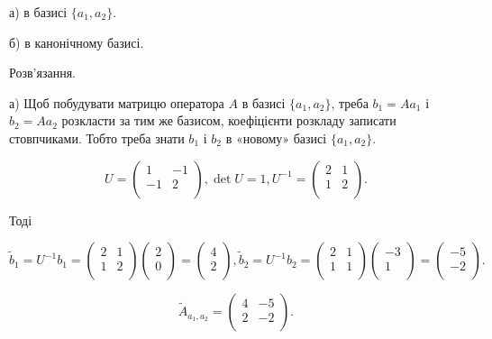 а) в базисі $\{a_1, a_2\}$.

б) в канонічному базисі.

Розв’язання.

а) Щоб побудувати матрицю оператора $A$ в базисі $\{a_1, a_2\}$, треба $b_1 = A a_1$ і
$b_2 = A a_2$ розкласти за тим же базисом, коефіцієнти розкладу записати
стовпчиками. Тобто треба знати $b_1$ і $b_2$ в «новому» базисі $\{a_1, a_2\}$.

$$U = \begin{pmatrix}
	1 & -1 \\
	-1 & 2 \\
\end{pmatrix}, \det U = 1, U^{-1} = \begin{pmatrix}
	2 & 1 \\
	1 & 2 \\
\end{pmatrix}.$$

Тоді 

$$\tilde{b}_1 = U^{-1} b_1 = \begin{pmatrix}
	2 & 1 \\
	1 & 2 \\
\end{pmatrix} \begin{pmatrix}
	2 \\
	0 \\
\end{pmatrix} = \begin{pmatrix}
	4 \\
	2 \\
\end{pmatrix}, \tilde{b}_2 = U^{-1} b_2 = \begin{pmatrix}
	2 & 1 \\
	1 & 1 \\
\end{pmatrix} \begin{pmatrix}
	-3 \\
	1 \\
\end{pmatrix} = \begin{pmatrix}
	-5 \\
	-2 \\
\end{pmatrix}.$$

$$\tilde{A}_{a_1, a_2} = \begin{pmatrix}
	4 & -5 \\
	2 & -2 \\
\end{pmatrix}.$$

